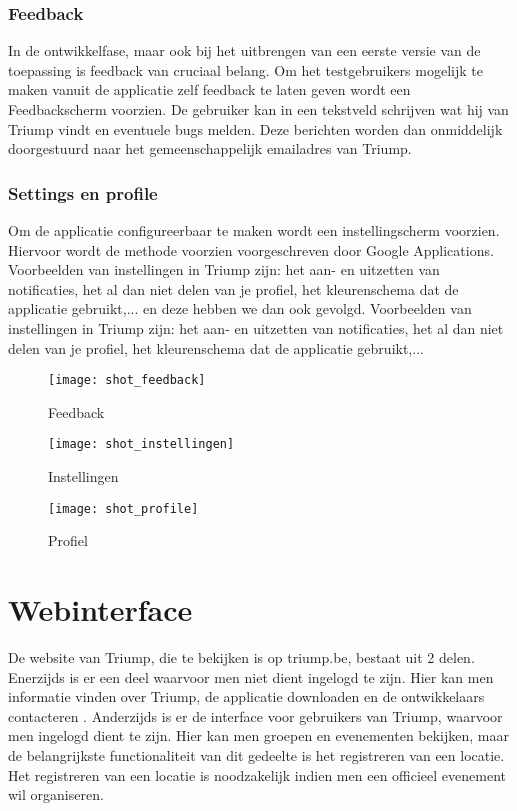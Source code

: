 \subsubsection{Feedback}%
In de ontwikkelfase, maar ook bij het uitbrengen van een eerste versie van de toepassing is feedback van cruciaal belang. Om het testgebruikers mogelijk te maken vanuit de applicatie zelf feedback te laten geven wordt een Feedbackscherm voorzien. De gebruiker kan in een tekstveld schrijven wat hij van Triump vindt en eventuele bugs melden. Deze berichten worden dan onmiddelijk doorgestuurd naar het gemeenschappelijk emailadres van Triump.
\subsubsection{Settings en profile}%
Om de applicatie configureerbaar te maken wordt een instellingscherm voorzien. Hiervoor wordt de methode voorzien voorgeschreven door Google Applications.
Voorbeelden van instellingen in Triump zijn: het aan- en uitzetten van notificaties, het al dan niet delen van je profiel, het kleurenschema dat de applicatie gebruikt,...
en deze hebben we dan ook gevolgd. Voorbeelden van instellingen in Triump zijn: het aan- en uitzetten van notificaties, het al dan niet delen van je profiel, het kleurenschema dat de applicatie gebruikt,...

\begin{figure}[ht]

\begin{minipage}[b]{0.25\linewidth}
\centering
\texttt{[image: shot\_feedback]}
\caption{Feedback}
\label{fig:shot_feedback}
\end{minipage}
\hspace{1.5cm}
\begin{minipage}[b]{0.25\linewidth}
\centering
\texttt{[image: shot\_instellingen]}
\caption{Instellingen}
\label{fig:shot_instellingen}
\end{minipage}
\hspace{1.5cm}
\begin{minipage}[b]{0.25\linewidth}
\centering
\texttt{[image: shot\_profile]}
\caption{Profiel}
\label{fig:shot_profile}
\end{minipage}
\end{figure}

\section{Webinterface}%
De website van Triump, die te bekijken is op triump.be, bestaat uit 2 delen. Enerzijds is er een deel waarvoor men niet dient ingelogd te zijn. Hier kan men informatie vinden over Triump, de applicatie downloaden en de ontwikkelaars contacteren . Anderzijds is er de interface voor gebruikers van Triump, waarvoor men ingelogd dient te zijn. Hier kan men groepen en evenementen bekijken, maar de belangrijkste functionaliteit van dit gedeelte is het registreren van een locatie.
Het registreren van een locatie is noodzakelijk indien men een officieel evenement wil organiseren.
